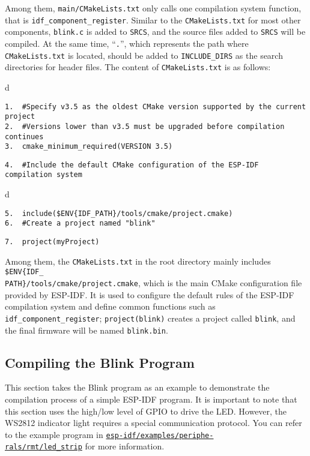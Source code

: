 \documentclass[a4paper,12pt]{book}
\begin{document}
Among them, \verb|main/CMakeLists.txt| only calls one compilation system function, that is \verb|idf_component_register|. Similar to the \verb|CMakeLists.txt| for most other components, \verb|blink.c| is added to \verb|SRCS|, and the source files added to \verb|SRCS| will be compiled. At the same time, “\verb|.|”, which represents the path where \verb|CMakeLists.txt| is located, should be added to \verb|INCLUDE_DIRS| as the search directories for header files. The content of \verb|CMakeLists.txt| is as follows:

\begin{codebloc}
\begin{tabular}{d}
\vspace{2pt}
\begin{verbatim}
1.  #Specify v3.5 as the oldest CMake version supported by the current project
2.  #Versions lower than v3.5 must be upgraded before compilation continues
3.  cmake_minimum_required(VERSION 3.5)
\end{verbatim}
\verb|4.  #Include the default CMake configuration of the ESP-IDF compilation system|
\end{tabular}
\end{codebloc}

\begin{codebloc}
\begin{tabular}{d}
\vspace{2pt}
\begin{verbatim}
5.  include($ENV{IDF_PATH}/tools/cmake/project.cmake)
6.  #Create a project named "blink"
\end{verbatim}
\verb|7.  project(myProject)|
\end{tabular}
\end{codebloc}

Among them, the \verb|CMakeLists.txt| in the root directory mainly includes \verb|$ENV{IDF_|\\ \verb|PATH}/tools/cmake/project.cmake|, which is the main CMake configuration file provided by ESP-IDF. It is used to configure the default rules of the ESP-IDF compilation system and define common functions such as \verb|idf_component_register|; \verb|project(blink)| creates a project called \verb|blink|, and the final firmware will be named \verb|blink.bin|.

\subsection{Compiling the Blink Program}
This section takes the Blink program as an example to demonstrate the compilation process of a simple ESP-IDF program. It is important to note that this section uses the high/low level of GPIO to drive the LED. However, the WS2812 indicator light requires a special communication protocol. You can refer to the example program in \href{https://github.com/espressif/esp-idf/tree/master/examples/peripherals/rmt/led_strip}{\texttt{esp-idf/examples/periphe-\\ rals/rmt/led\_strip}} for more information.
\end{document}
